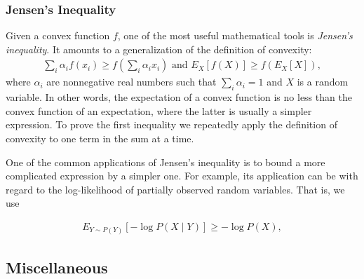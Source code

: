 \documentclass[a4paper,12pt]{article}
\theoremstyle{definition}
\begin{document}
\subsubsection*{Jensen's Inequality}
Given a convex function $f$, one of the most useful mathematical tools is \emph{Jensen's inequality}. It amounts to a generalization of the definition of convexity:
\begin{equation*}
    \begin{aligned}
        \sum_i \alpha_i f(x_i)  \geq f\left(\sum_i \alpha_i x_i\right)    \text{ and }    E_X[f(X)]  \geq f\left(E_X[X]\right),
    \end{aligned}
\end{equation*}
where $\alpha_i$ are nonnegative real numbers such that $\sum_i \alpha_i = 1$ and $X$ is 
a random variable. In other words, the expectation of a convex function is no less than 
the convex function of an expectation, where the latter is usually a simpler expression. 
To prove the first inequality we repeatedly apply the definition of convexity to one term 
in the sum at a time.

One of the common applications of Jensen's inequality is to bound a more complicated 
expression by a simpler one. For example, its application can be with regard to the 
log-likelihood of partially observed random variables. That is, we use

\begin{equation*}
    \begin{aligned}
        E_{Y \sim P(Y)}[-\log P(X \mid Y)] \geq -\log P(X),
    \end{aligned}
\end{equation*}








\newpage
\subsection*{Miscellaneous}
\end{document}
